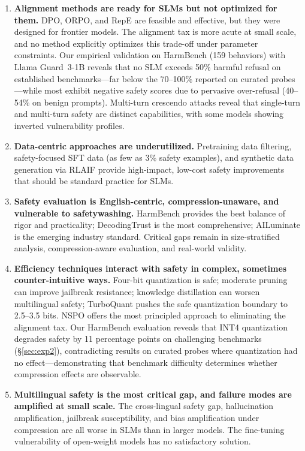 \documentclass[12pt,a4paper]{article}
\begin{document}
\begin{enumerate}[leftmargin=*]
    \item \textbf{Alignment methods are ready for SLMs but not optimized for them.} DPO, ORPO, and RepE are feasible and effective, but they were designed for frontier models. The alignment tax is more acute at small scale, and no method explicitly optimizes this trade-off under parameter constraints. Our empirical validation on HarmBench (159 behaviors) with Llama Guard~3-1B reveals that no SLM exceeds 50\% harmful refusal on established benchmarks---far below the 70--100\% reported on curated probes---while most exhibit negative safety scores due to pervasive over-refusal (40--54\% on benign prompts). Multi-turn crescendo attacks reveal that single-turn and multi-turn safety are distinct capabilities, with some models showing inverted vulnerability profiles.

    \item \textbf{Data-centric approaches are underutilized.} Pretraining data filtering, safety-focused SFT data (as few as 3\% safety examples), and synthetic data generation via RLAIF provide high-impact, low-cost safety improvements that should be standard practice for SLMs.

    \item \textbf{Safety evaluation is English-centric, compression-unaware, and vulnerable to safetywashing.} HarmBench provides the best balance of rigor and practicality; DecodingTrust is the most comprehensive; AILuminate is the emerging industry standard. Critical gaps remain in size-stratified analysis, compression-aware evaluation, and real-world validity.

    \item \textbf{Efficiency techniques interact with safety in complex, sometimes counter-intuitive ways.} Four-bit quantization is safe; moderate pruning can improve jailbreak resistance; knowledge distillation can worsen multilingual safety; TurboQuant pushes the safe quantization boundary to 2.5--3.5 bits. NSPO offers the most principled approach to eliminating the alignment tax. Our HarmBench evaluation reveals that INT4 quantization degrades safety by 11 percentage points on challenging benchmarks (\S\ref{sec:exp2}), contradicting results on curated probes where quantization had no effect---demonstrating that benchmark difficulty determines whether compression effects are observable.

    \item \textbf{Multilingual safety is the most critical gap, and failure modes are amplified at small scale.} The cross-lingual safety gap, hallucination amplification, jailbreak susceptibility, and bias amplification under compression are all worse in SLMs than in larger models. The fine-tuning vulnerability of open-weight models has no satisfactory solution.
\end{enumerate}
\end{document}
